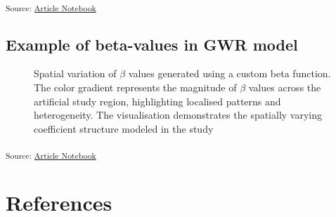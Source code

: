 \documentclass[
  default,
]{sn-jnl}
\begin{document}
\begin{table}
{}

\end{table}%

\textsubscript{Source:
\href{https://indiraputeri-phd.github.io/CAR_simcomp/manuscript.qmd.html}{Article
Notebook}}

\subsection*{Example of beta-values in GWR
model}\label{example-of-beta-values-in-gwr-model}

\label{cell-fig-betaplot}
\begin{figure}[H]


\caption{\label{fig-betaplot}Spatial variation of \(\beta\) values
generated using a custom beta function. The color gradient represents
the magnitude of \(\beta\) values across the artificial study region,
highlighting localised patterns and heterogeneity. The visualisation
demonstrates the spatially varying coefficient structure modeled in the
study}

\end{figure}%

\textsubscript{Source:
\href{https://indiraputeri-phd.github.io/CAR_simcomp/manuscript.qmd.html}{Article
Notebook}}

\section*{References}\label{references}
\end{document}
